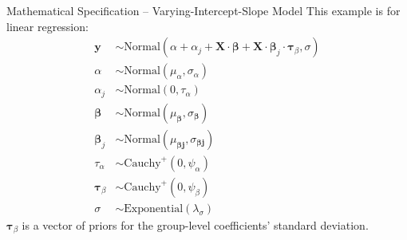 \begin{frame}{Mathematical Specification -- Varying-Intercept-Slope Model}
	This example is for linear regression:
	$$
		\begin{aligned}
			\mathbf{y}              & \sim \text{Normal}\left( \alpha + \alpha_j + \mathbf{X} \cdot \boldsymbol{\beta} + \mathbf{X} \cdot \boldsymbol{\beta}_j \cdot \boldsymbol{\tau}_\beta, \sigma \right) \\
			\alpha                  & \sim \text{Normal}(\mu_\alpha, \sigma_\alpha)                                                                                                                          \\
			\alpha_j                & \sim \text{Normal}(0, \tau_\alpha)                                                                                                                                     \\
			\boldsymbol{\beta}      & \sim \text{Normal}(\mu_{\boldsymbol{\beta}}, \sigma_{\boldsymbol{\beta}})                                                                                              \\
			\boldsymbol{\beta}_j    & \sim \text{Normal}(\mu_{\boldsymbol{\beta j}}, \sigma_{\boldsymbol{\beta j}})                                                                                          \\
			\tau_\alpha             & \sim \text{Cauchy}^+(0, \psi_{\alpha})                                                                                                                                 \\
			\boldsymbol{\tau}_\beta & \sim \text{Cauchy}^+(0, \psi_{\beta})                                                                                                                                  \\
			\sigma                  & \sim \text{Exponential}(\lambda_\sigma)
		\end{aligned}
	$$
	$\boldsymbol{\tau}_\beta$ is a vector of priors for the group-level coefficients'
	standard deviation.
\end{frame}

